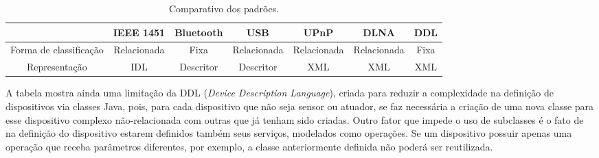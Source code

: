 \begin{table}
	\caption{Comparativo dos padrões.}
	\begin{center}
	\resizebox{16cm}{!} {
		\begin{tabular}{ccccccc}
		\hline
							& \textbf{IEEE 1451}	& \textbf{Bluetooth} 	& \textbf{USB}	& \textbf{UPnP} & \textbf{DLNA} & \textbf{DDL}\\
		\hline
		Forma de classificação 		& Relacionada 			& Fixa 					& Relacionada 	& Relacionada 	& Relacionada 	& Fixa \\
		\hline
		Representação 		& IDL 					& Descritor				& Descritor		& XML			& XML 			& XML \\ 
		\hline
		\end{tabular}
	}
	\end{center}
	\label{tab:comparativo}
\end{table}

A tabela mostra ainda uma limitação da DDL (\emph{Device Description Language}), criada para reduzir a complexidade na definição de dispositivos via classes Java, pois, para cada dispositivo que não seja sensor ou atuador, se faz necessária a criação de uma nova classe para esse dispositivo complexo não-relacionada com outras que já tenham sido criadas. Outro fator que impede o uso de subclasses é o fato de na definição do dispositivo estarem definidos também seus serviços, modelados como operações. Se um dispositivo possuir apenas uma operação que receba parâmetros diferentes, por exemplo, a classe anteriormente definida não poderá ser reutilizada. 

